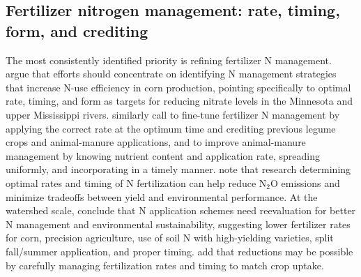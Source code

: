 \documentclass[11pt]{article}
\begin{document}
\subsection{Fertilizer nitrogen management: rate, timing, form, and crediting}
The most consistently identified priority is refining fertilizer N management. \textcite{Zhao2000} argue that efforts should concentrate on identifying N management strategies that increase N-use efficiency in corn production, pointing specifically to optimal rate, timing, and form as targets for reducing nitrate levels in the Minnesota and upper Mississippi rivers. \textcite{Randall2001} similarly call to fine-tune fertilizer N management by applying the correct rate at the optimum time and crediting previous legume crops and animal-manure applications, and to improve animal-manure management by knowing nutrient content and application rate, spreading uniformly, and incorporating in a timely manner. \textcite{Emmett2022} note that research determining optimal rates and timing of N fertilization can help reduce N$_2$O emissions and minimize tradeoffs between yield and environmental performance. At the watershed scale, \textcite{Dattamudi2020} conclude that N application schemes need reevaluation for better N management and environmental sustainability, suggesting lower fertilizer rates for corn, precision agriculture, use of soil N with high-yielding varieties, split fall/summer application, and proper timing. \textcite{Elmi2002} add that reductions may be possible by carefully managing fertilization rates and timing to match crop uptake.
\end{document}

